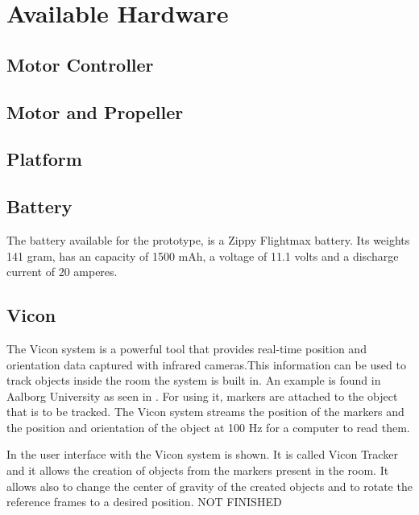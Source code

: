 \section{Available Hardware}

\subsection{Motor Controller}



\subsection{Motor and Propeller}

\subsection{Platform}

\subsection{Battery}

The battery available for the prototype, is a Zippy Flightmax battery. Its weights 141 gram, has an capacity of 1500 mAh, a voltage of 11.1 volts and a discharge current of 20 amperes. 


\subsection{Vicon}

The Vicon system is a powerful tool that provides real-time position and orientation data captured with infrared cameras.This information can be used to track objects inside the room the system is built in. An example is found in Aalborg University as seen in . 
For using it, markers are attached to the object that is to be tracked. The Vicon system streams the position of the markers and the position and orientation of the object at 100 Hz for a computer to read them.

In  the user interface with the Vicon system is shown. It is called Vicon Tracker and it allows the creation of objects from the markers present in the room. It allows also to change the center of gravity of the created objects and to rotate the reference frames to a desired position.
NOT FINISHED
